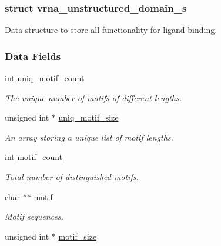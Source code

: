\subsubsection{struct vrna\+\_\+unstructured\+\_\+domain\+\_\+s}
Data structure to store all functionality for ligand binding. \subsubsection*{Data Fields}
\begin{DoxyCompactItemize}
\item 
int \hyperlink{group__domains__up_ae17005ef8043aca2fc3864804cd5def6}{uniq\+\_\+motif\+\_\+count}\hypertarget{group__domains__up_ae17005ef8043aca2fc3864804cd5def6}{}\label{group__domains__up_ae17005ef8043aca2fc3864804cd5def6}

\begin{DoxyCompactList}\small\item\em The unique number of motifs of different lengths. \end{DoxyCompactList}\item 
unsigned int $\ast$ \hyperlink{group__domains__up_a2b484b0e19a47145db7055ada8b14159}{uniq\+\_\+motif\+\_\+size}\hypertarget{group__domains__up_a2b484b0e19a47145db7055ada8b14159}{}\label{group__domains__up_a2b484b0e19a47145db7055ada8b14159}

\begin{DoxyCompactList}\small\item\em An array storing a unique list of motif lengths. \end{DoxyCompactList}\item 
int \hyperlink{group__domains__up_a5ad34148ea1d2e501f3e02029449546e}{motif\+\_\+count}\hypertarget{group__domains__up_a5ad34148ea1d2e501f3e02029449546e}{}\label{group__domains__up_a5ad34148ea1d2e501f3e02029449546e}

\begin{DoxyCompactList}\small\item\em Total number of distinguished motifs. \end{DoxyCompactList}\item 
char $\ast$$\ast$ \hyperlink{group__domains__up_af285436bbdea4436ad2cedec65d48c75}{motif}\hypertarget{group__domains__up_af285436bbdea4436ad2cedec65d48c75}{}\label{group__domains__up_af285436bbdea4436ad2cedec65d48c75}

\begin{DoxyCompactList}\small\item\em Motif sequences. \end{DoxyCompactList}\item 
unsigned int $\ast$ \hyperlink{group__domains__up_a6a9f89ab7d147eb0ffd6cf8d77d178c0}{motif\+\_\+size}\hypertarget{group__domains__up_a6a9f89ab7d147eb0ffd6cf8d77d178c0}{}\label{group__domains__up_a6a9f89ab7d147eb0ffd6cf8d77d178c0}


\end{DoxyCompactItemize}

